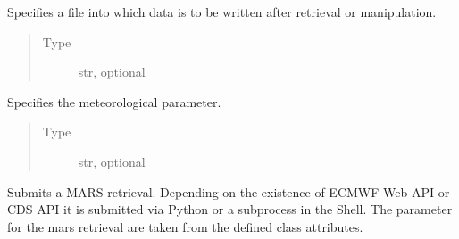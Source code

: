 \documentclass[letterpaper,10pt,english]{sphinxmanual}
\begin{document}
\begin{fulllineitems}
\begin{fulllineitems}
\begin{quote}
\begin{description}
\end{description}\end{quote}

\end{fulllineitems}


\begin{fulllineitems}
\label{\detokenize{api:MarsRetrieval.MarsRetrieval.target}}
Specifies a file into which data is to be written after
retrieval or manipulation.
\begin{quote}\begin{description}
\item[{Type}] \leavevmode
str, optional

\end{description}\end{quote}

\end{fulllineitems}


\begin{fulllineitems}
\label{\detokenize{api:MarsRetrieval.MarsRetrieval.param}}
Specifies the meteorological parameter.
\begin{quote}\begin{description}
\item[{Type}] \leavevmode
str, optional

\end{description}\end{quote}

\end{fulllineitems}


\begin{fulllineitems}
\label{\detokenize{api:MarsRetrieval.MarsRetrieval.data_retrieve}}
Submits a MARS retrieval. Depending on the existence of
ECMWF Web-API or CDS API it is submitted via Python or a
subprocess in the Shell. The parameter for the mars retrieval
are taken from the defined class attributes.


\end{fulllineitems}
\end{fulllineitems}
\end{document}
